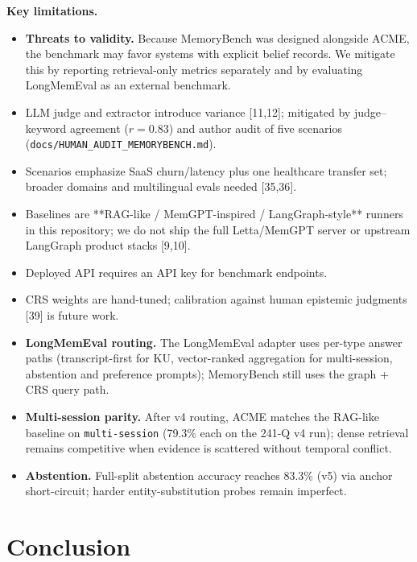 \documentclass[11pt,a4paper]{article}
\begin{document}
\begin{keyfinding}
\textbf{Key limitations.}
\begin{itemize}
\item \textbf{Threats to validity.} Because MemoryBench was designed alongside ACME, the benchmark may favor systems with explicit belief records. We mitigate this by reporting retrieval-only metrics separately and by evaluating LongMemEval as an external benchmark.
\item LLM judge and extractor introduce variance [11,12]; mitigated by judge--keyword agreement ($r{=}0.83$) and author audit of five scenarios (\texttt{docs/HUMAN\_AUDIT\_MEMORYBENCH.md}).
\item Scenarios emphasize SaaS churn/latency plus one healthcare transfer set; broader domains and multilingual evals needed [35,36].
\item Baselines are **RAG-like / MemGPT-inspired / LangGraph-style** runners in this repository; we do not ship the full Letta/MemGPT server or upstream LangGraph product stacks [9,10].
\item Deployed API requires an API key for benchmark endpoints.
\item CRS weights are hand-tuned; calibration against human epistemic judgments [39] is future work.
\item \textbf{LongMemEval routing.} The LongMemEval adapter uses per-type answer paths (transcript-first for KU, vector-ranked aggregation for multi-session, abstention and preference prompts); MemoryBench still uses the graph + CRS query path.
\item \textbf{Multi-session parity.} After v4 routing, ACME matches the RAG-like baseline on \texttt{multi-session} (79.3\% each on the 241-Q v4 run); dense retrieval remains competitive when evidence is scattered without temporal conflict.
\item \textbf{Abstention.} Full-split abstention accuracy reaches 83.3\% (v5) via anchor short-circuit; harder entity-substitution probes remain imperfect.
\end{itemize}
\end{keyfinding}

\section{Conclusion}\label{conclusion}
\end{document}
